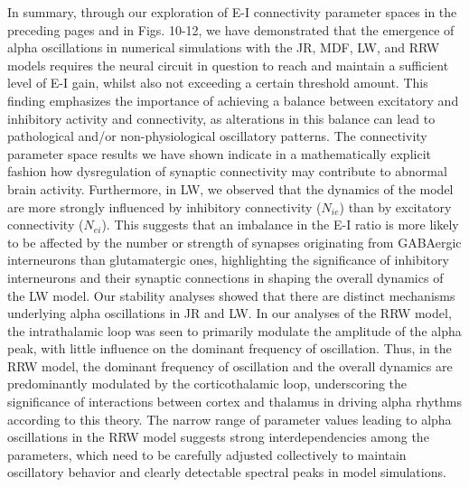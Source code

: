 \documentclass[12pt,twoside]{article}
\begin{document}
In summary, through our exploration of E-I connectivity parameter spaces in the preceding pages and in Figs. 10-12, we have demonstrated that the emergence of alpha oscillations in numerical simulations with the JR, MDF, LW, and RRW models requires the neural circuit in question to reach and maintain a sufficient level of E-I gain, whilst also not exceeding a certain threshold amount. This finding emphasizes the importance of achieving a balance between excitatory and inhibitory activity and connectivity, as alterations in this balance can lead to pathological and/or non-physiological oscillatory patterns. The connectivity parameter space results we have shown indicate in a mathematically explicit fashion how dysregulation of synaptic connectivity may contribute to abnormal brain activity. Furthermore, in LW, we observed that the dynamics of the model are more strongly influenced by inhibitory connectivity ($N_{ie}$) than by excitatory connectivity ($N_{ei}$). This suggests that an imbalance in the E-I ratio is more likely to be affected by the number or strength of synapses originating from GABAergic interneurons than glutamatergic ones, highlighting the significance of inhibitory interneurons and their synaptic connections in shaping the overall dynamics of the LW model.
Our stability analyses showed that there are distinct mechanisms underlying alpha oscillations in JR and LW. In our analyses of the RRW model, the intrathalamic loop was seen to primarily modulate the amplitude of the alpha peak, with little influence on the dominant frequency of oscillation. Thus, in the RRW model, the dominant frequency of oscillation and the overall dynamics are predominantly modulated by the corticothalamic loop, underscoring the significance of interactions between cortex and thalamus in driving alpha rhythms according to this theory. The narrow range of parameter values leading to alpha oscillations in the RRW model suggests strong interdependencies among the parameters, which need to be carefully adjusted collectively to maintain oscillatory behavior and clearly detectable spectral peaks in model simulations.
\end{document}
